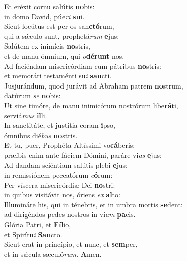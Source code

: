 \evenverse Et eréxit cornu salútis \textbf{no}bis:~\*\\
\evenverse in domo David, púe\textit{ri} \textbf{su}i.\\
\oddverse Sicut locútus est per os san\textbf{ctó}rum,~\*\\
\oddverse qui a sǽculo sunt, prophetá\textit{rum} \textbf{e}jus:\\
\evenverse Salútem ex inimícis \textbf{no}stris,~\*\\
\evenverse et de manu ómnium, qui \textit{o}\textbf{dé}\textbf{runt} nos.\\
\oddverse Ad faciéndam misericórdiam cum pátribus \textbf{no}stris:~\*\\
\oddverse et memorári testaménti su\textit{i} \textbf{san}cti.\\
\evenverse Jusjurándum, quod jurávit ad Abraham patrem \textbf{no}strum,~\*\\
\evenverse datúrum \textit{se} \textbf{no}bis:\\
\oddverse Ut sine timóre, de manu inimicórum nostrórum libe\textbf{rá}ti,~\*\\
\oddverse serviá\textit{mus} \textbf{il}li.\\
\evenverse In sanctitáte, et justítia coram \textbf{i}pso,~\*\\
\evenverse ómnibus dié\textit{bus} \textbf{no}stris.\\
\oddverse Et tu, puer, Prophéta Altíssimi vo\textbf{cá}beris:~\*\\
\oddverse præíbis enim ante fáciem Dómini, paráre vi\textit{as} \textbf{e}jus:\\
\evenverse Ad dandam sciéntiam salútis plebi \textbf{e}jus:~\*\\
\evenverse in remissiónem peccatórum \textit{e}\textbf{ó}rum:\\
\oddverse Per víscera misericórdiæ Dei \textbf{no}stri:~\*\\
\oddverse in quibus visitávit nos, óriens \textit{ex} \textbf{al}to:\\
\evenverse Illumináre his, qui in ténebris, et in umbra mortis \textbf{se}dent:~\*\\
\evenverse ad dirigéndos pedes nostros in vi\textit{am} \textbf{pa}cis.\\
\oddverse Glória Patri, et \textbf{Fí}lio,~\*\\
\oddverse et Spirítu\textit{i} \textbf{San}cto.\\
\evenverse Sicut erat in princípio, et nunc, et \textbf{sem}per,~\*\\
\evenverse et in sǽcula sæculó\textit{rum}. \textbf{A}men.\\
